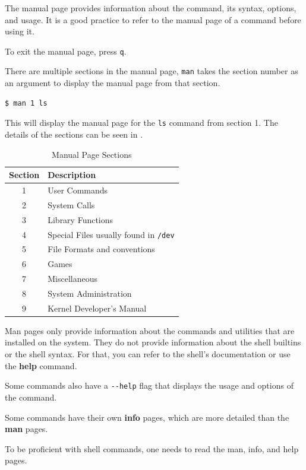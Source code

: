 The manual page provides information about the command, its syntax, options, and usage.
It is a good practice to refer to the manual page of a command before using it.

To exit the manual page, press \texttt{q}.

There are multiple sections in the manual page, \texttt{man} takes the section number as an argument to display the manual page from that section.

\begin{lstlisting}[language=bash]
  $ man 1 ls
\end{lstlisting}

This will display the manual page for the \texttt{ls} command from section 1. The details of the sections can be seen in .

\begin{table}[h!]
\caption{Manual Page Sections}
\begin{tabular}{ c l }
  \toprule
 Section & Description \\
 \midrule
  1 & User Commands \\
  2 & System Calls \\
  3 & Library Functions \\
  4 & Special Files usually found in \texttt{/dev} \\
  5 & File Formats and conventions \\
  6 & Games \\
  7 & Miscellaneous \\
  8 & System Administration \\
  9 & Kernel Developer's Manual \\
  \bottomrule
\end{tabular}
\end{table}

Man pages only provide information about the commands and utilities that are installed on the system. They do not provide information about the shell builtins or the shell syntax. For that, you can refer to the shell's documentation or use the \textbf{help} command.

Some commands also have a \texttt{-{}-{}help} flag that displays the usage and options of the command.

Some commands have their own \textbf{info} pages, which are more detailed than the \textbf{man} pages.

To be proficient with shell commands, one needs to read the man, info, and help pages.

